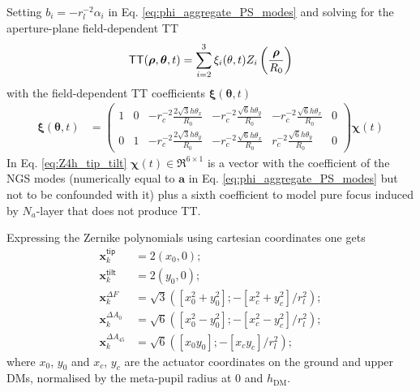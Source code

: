 \documentclass[a4paper,12pt]{article}
\newcommand{\0}{\mathsf{0}} %
\newcommand{\Proj}{\mathbf{H}} %
\newcommand{\TT}{\mathsf{\tiny{TT}}}
\newcommand{\QPS}{\mathsf{\tiny{PS2Q}}}
\newcommand{\ps}{\chi}
\newcommand{\xvec}{{\mathbf{x}}}
\newcommand{\ps}{\mu}
\newcommand{\ProjTheta}{\mathbf{P}_{\theta}\,} %
\newcommand{\Proj}{\mathbf{P}} %
\begin{document}
Setting $b_i = -
r_l^{-2}\alpha_i$ in Eq. \eqref{eq:phi_aggregate_PS_modes} and
solving for the aperture-plane field-dependent TT %
\begin{equation}\label{eq:field-dependent-TT}
\TT(\boldsymbol{\rho}, \boldsymbol{\theta},t)= \sum_{i=2}^{3}
\xi_i(\mathbf{\theta}, t)Z_i\left(\frac{\boldsymbol{\rho}}{R_0}\right)
\end{equation}
with the field-dependent TT coefficients
$\boldsymbol\xi(\boldsymbol\theta,t)$ \cite{flicker03} 
\begin{align}\label{eq:Z4h_tip_tilt}
            \boldsymbol\xi(\boldsymbol\theta,t)
& =  %
\left( 
            \begin{array}{cccccc}
              1&0&-r_c^{-2}\frac{2\sqrt{3}h\theta_x}{R_0} &
              -r_c^{-2}\frac{\sqrt{6}h\theta_y}{R_0} &
              -r_c^{-2}\frac{\sqrt{6}h\theta_x}{ R_0} &0 \\ 
0&1&-r_c^{-2}\frac{2\sqrt{3}h\theta_y}{R_0} &
              -r_c^{-2}\frac{\sqrt{6}h\theta_x}{R_0} &
              r_c^{-2}\frac{\sqrt{6}h\theta_y}{ R_0} &0
              \end{array}\right) \boldsymbol\ps(t)
\end{align}
In Eq. \eqref{eq:Z4h_tip_tilt}
$\boldsymbol\ps(t)\in \Re^{6\times1}$
is a vector with the coefficient of the NGS modes (numerically equal
to $\mathbf{a}$ in Eq. \eqref{eq:phi_aggregate_PS_modes} but not to be
confounded with it) plus a sixth coefficient to model pure focus
induced by  $N_a$-layer that does not produce TT.

Expressing the Zernike polynomials using cartesian coordinates one gets
\begin{subequations}\label{eq:TT_PS_definition}
\begin{align}\label{eq:plate_scale_def}
  \xvec_{k}^{\textsf{tip}} & = 2(x_0, 0);\\
   \xvec_{k}^{\textsf{tilt}}  & = 2(y_0, 0);\\
   \xvec_{k}^{\Delta F}  & = \sqrt{3}([x_0^2 + y_0^2]; -[x_c^2 + y_c^2]/r_l^2);\\
   \xvec_{k}^{\Delta A_0} & = \sqrt{6} ([x_0^2 - y_0^2]; -[x_c^2 - y_c^2]/r_l^2);\\
   \xvec_{k}^{\Delta A_{45}}  & = \sqrt{6} ([x_0 y_0];-[x_c y_c]/r_l^2);
\end{align}
\end{subequations}
where $x_0$, $y_0$ and $x_c$, $y_c$ are the actuator coordinates
on the ground and upper DMs, normalised by the meta-pupil radius at 0
and $h_\text{DM}$.
\end{document}
